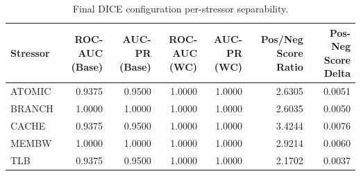 \begin{table}[t]
\centering
\caption{Final DICE configuration per-stressor separability.}
\label{tab:dice_full_stressor}
\footnotesize
\begin{tabular}{lrrrrrr}
\toprule
Stressor & ROC-AUC (Base) & AUC-PR (Base) & ROC-AUC (WC) & AUC-PR (WC) & Pos/Neg Score Ratio & Pos-Neg Score Delta \\
\midrule
ATOMIC & 0.9375 & 0.9500 & 1.0000 & 1.0000 & 2.6305 & 0.0051 \\
BRANCH & 1.0000 & 1.0000 & 1.0000 & 1.0000 & 2.6035 & 0.0050 \\
CACHE & 0.9375 & 0.9500 & 1.0000 & 1.0000 & 3.4244 & 0.0076 \\
MEMBW & 1.0000 & 1.0000 & 1.0000 & 1.0000 & 2.9214 & 0.0060 \\
TLB & 0.9375 & 0.9500 & 1.0000 & 1.0000 & 2.1702 & 0.0037 \\
\bottomrule
\end{tabular}

\end{table}
